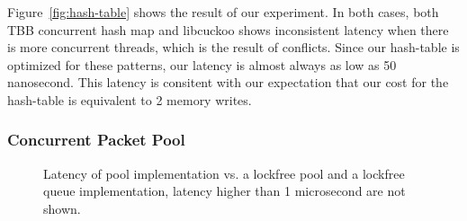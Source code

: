 Figure~\ref{fig:hash-table} shows the result of our experiment. In both cases,
both TBB concurrent hash map and libcuckoo shows inconsistent latency when
there is more concurrent threads, which is the result of conflicts. Since our
hash-table is optimized for these patterns, our latency is almost always as low
as 50 nanosecond. This latency is consitent with our expectation that our cost
for the hash-table is equivalent to 2 memory writes.

\subsubsection{Concurrent Packet Pool}
\begin{figure}[ht]
      \centering
      \caption{Latency of pool implementation vs. a lockfree pool and a lockfree queue
        implementation, latency higher than 1 microsecond are not shown\label{fig:pool}.}
\end{figure}

